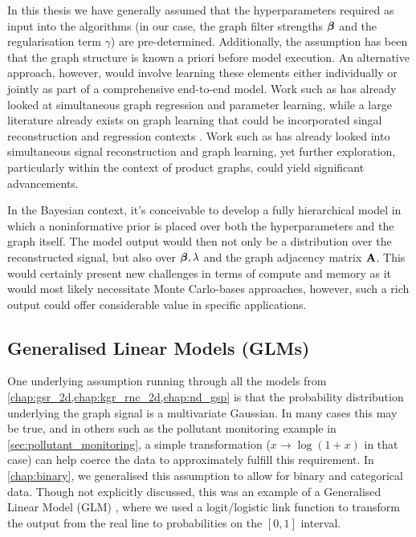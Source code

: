 In this thesis we have generally assumed that the hyperparameters required as input into the algorithms (in our case, the graph filter strengths $\boldsymbol{\beta}$ and the regularisation term $\gamma$) are pre-determined. Additionally, the assumption has been that the graph structure is known a priori before model execution. An alternative approach, however, would involve learning these elements either individually or jointly as part of a comprehensive end-to-end model. Work such as \cite{Zhi2023} has already looked at simultaneous graph regression and parameter learning, while a large literature already exists on graph learning that could be incorporated singal reconstruction and regression contexts \citep{Dong2019}. Work such as \cite{Hu2015} has already looked into simultaneous signal reconstruction and graph learning, yet further exploration, particularly within the context of product graphs, could yield significant advancements.

In the Bayesian context, it's conceivable to develop a fully hierarchical model in which a noninformative prior is placed over both the hyperparameters and the graph itself. The model output would then not only be a distribution over the reconstructed signal, but also over $\boldsymbol{\beta}, \lambda$ and the graph adjacency matrix $\mathbf{A}$. This would certainly present new challenges in terms of compute and memory as it would most likely necessitate Monte Carlo-bases approaches, however, such a rich output could offer considerable value in specific applications.


\subsection{Generalised Linear Models (GLMs)}

One underlying assumption running through all the models from \cref{chap:gsr_2d,chap:kgr_rnc_2d,chap:nd_gsp}  is that the probability distribution underlying the graph signal is a multivariate Gaussian. In many cases this may be true, and in others such as the pollutant monitoring example in \cref{sec:pollutant_monitoring}, a simple transformation ($x \rightarrow \log( 1 + x)$ in that case) can help coerce the data to approximately fulfill this requirement. In \cref{chap:binary}, we generalised this assumption to allow for binary and categorical data. Though not explicitly discussed, this was an example of a Generalised Linear Model (GLM) \citep{Nelder1972}, where we used a logit/logistic link function to transform the output from the real line to probabilities on the $[0, 1]$ interval. 

